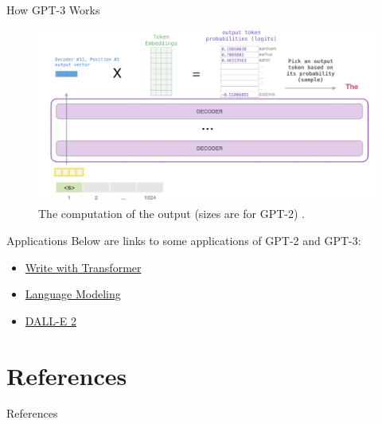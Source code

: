 \documentclass{beamer}
\begin{document}
\begin{frame}{How GPT-3 Works}
    \begin{figure}
        \centering
        \includegraphics[scale=0.35]{gpt3_output}
        \caption{The computation of the output (sizes are for GPT-2) \cite{alammar2019}.}
        \label{fig:gpt3_output}
    \end{figure}
\end{frame}

\begin{frame}{Applications}
    Below are links to some applications of GPT-2 and GPT-3:
    \begin{itemize}
        \item \href{https://transformer.huggingface.co/doc/distil-gpt2}{Write with Transformer}
        \item \href{https://demo.allennlp.org/next-token-lm}{Language Modeling}
        \item \href{https://openai.com/dall-e-2/}{DALL-E 2}
    \end{itemize}
\end{frame}

\section{References}

\begin{frame}[allowframebreaks]{References}
    \nocite{*}
    \printbibliography
\end{frame}
\end{document}
